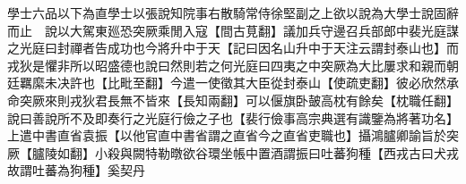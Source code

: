 學士六品以下為直學士以張說知院事右散騎常侍徐堅副之上欲以說為大學士說固辭而止　說以大駕東廵恐突厥乘閒入寇【間古莧翻】議加兵守邊召兵部郎中裴光庭謀之光庭曰封禪者告成功也今將升中于天【記曰因名山升中于天注云謂封泰山也】而戎狄是懼非所以昭盛德也說曰然則若之何光庭曰四夷之中突厥為大比屢求和親而朝廷羈縻未决許也【比毗至翻】今遣一使徵其大臣從封泰山【使疏吏翻】彼必欣然承命突厥來則戎狄君長無不皆來【長知兩翻】可以偃旗卧皷高枕有餘矣【枕職任翻】說曰善說所不及即奏行之光庭行儉之子也【裴行儉事高宗典選有識鑒為將著功名】上遣中書直省袁振【以他官直中書省謂之直省今之直省吏職也】攝鴻臚卿諭旨於突厥【臚陵如翻】小殺與闕特勒暾欲谷環坐帳中置酒謂振曰吐蕃狗種【西戎古曰犬戎故謂吐蕃為狗種】奚契丹